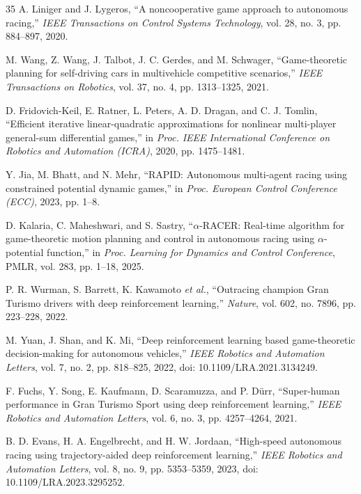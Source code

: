 \documentclass[final,5p,twocolumn]{elsarticle}
\begin{document}
\begin{thebibliography}{35}
A. Liniger and J. Lygeros,
``A noncooperative game approach to autonomous racing,''
\emph{IEEE Transactions on Control Systems Technology}, vol. 28, no. 3,
pp. 884--897, 2020.

M. Wang, Z. Wang, J. Talbot, J. C. Gerdes, and M. Schwager,
``Game-theoretic planning for self-driving cars in multivehicle competitive
scenarios,'' \emph{IEEE Transactions on Robotics}, vol. 37, no. 4,
pp. 1313--1325, 2021.

D. Fridovich-Keil, E. Ratner, L. Peters, A. D. Dragan, and C. J. Tomlin,
``Efficient iterative linear-quadratic approximations for nonlinear
multi-player general-sum differential games,'' in \emph{Proc. IEEE
International Conference on Robotics and Automation (ICRA)}, 2020,
pp. 1475--1481.

Y. Jia, M. Bhatt, and N. Mehr,
``RAPID: Autonomous multi-agent racing using constrained potential dynamic
games,'' in \emph{Proc. European Control Conference (ECC)}, 2023, pp. 1--8.

D. Kalaria, C. Maheshwari, and S. Sastry,
``$\alpha$-RACER: Real-time algorithm for game-theoretic motion planning and
control in autonomous racing using $\alpha$-potential function,'' in
\emph{Proc. Learning for Dynamics and Control Conference}, PMLR, vol. 283,
pp. 1--18, 2025.

P. R. Wurman, S. Barrett, K. Kawamoto \emph{et al.},
``Outracing champion Gran Turismo drivers with deep reinforcement learning,''
\emph{Nature}, vol. 602, no. 7896, pp. 223--228, 2022.

M. Yuan, J. Shan, and K. Mi,
``Deep reinforcement learning based game-theoretic decision-making for
autonomous vehicles,'' \emph{IEEE Robotics and Automation Letters}, vol. 7,
no. 2, pp. 818--825, 2022, doi: 10.1109/LRA.2021.3134249.

F. Fuchs, Y. Song, E. Kaufmann, D. Scaramuzza, and P. D\"urr,
``Super-human performance in Gran Turismo Sport using deep reinforcement
learning,'' \emph{IEEE Robotics and Automation Letters}, vol. 6, no. 3,
pp. 4257--4264, 2021.

B. D. Evans, H. A. Engelbrecht, and H. W. Jordaan,
``High-speed autonomous racing using trajectory-aided deep reinforcement
learning,'' \emph{IEEE Robotics and Automation Letters}, vol. 8, no. 9,
pp. 5353--5359, 2023, doi: 10.1109/LRA.2023.3295252.


\end{thebibliography}
\end{document}
